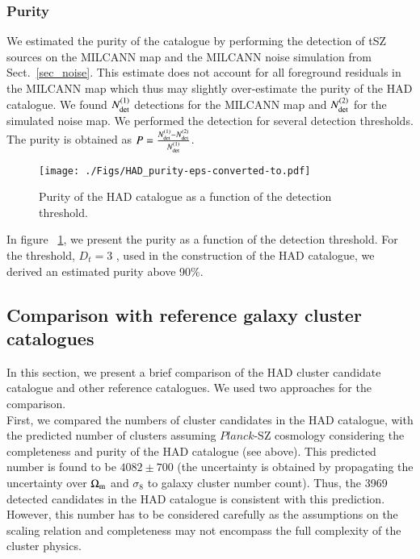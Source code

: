\documentclass[traditabstract,a4,twocolumn]{aa}
\begin{document}
\subsubsection{Purity}

We estimated the purity of the catalogue by performing the
detection of tSZ sources on the MILCANN map and the MILCANN noise
simulation from Sect.~\ref{sec_noise}. This estimate does not
account for all foreground residuals in the MILCANN map which thus
may slightly over-estimate the purity of the HAD catalogue.  We
found $N^{(1)}_{\rm det}$ detections for the MILCANN map and
$N^{(2)}_{\rm det}$ for the simulated noise map. We performed the
detection for several detection thresholds.  The purity is obtained as
$P = \frac{N^{(1)}_{\rm det} - N^{(2)}_{\rm det}}{N^{(1)}_{\rm det}}$.
\begin{figure}[!th]
\begin{center}
\texttt{[image: ./Figs/HAD\_purity-eps-converted-to.pdf]}
\caption{Purity of the HAD catalogue as a function of the detection threshold.}
\label{purefig}
\end{center}
\end{figure}
In figure ~\ref{purefig}, we present the purity as a function of the
detection threshold. For the threshold, $D_t = 3$ , used in the construction of the HAD catalogue, we derived an estimated purity above 90\%.


\subsection{Comparison with reference galaxy cluster catalogues}

In this section, we present a brief comparison of the HAD
cluster candidate catalogue and other reference catalogues.  We
  used two approaches for the comparison.\\ First, we compared the
  numbers of cluster candidates in the HAD catalogue, with the
  predicted number of clusters assuming $Planck$-SZ cosmology
  \citep{planckSZC} considering the completeness and purity of the
  HAD catalogue (see above). This predicted number is found to be $4082 \pm 700$ (the uncertainty is obtained by propagating the uncertainty over $\Omega_{\rm m}$ and $\sigma_8$ to galaxy cluster number count).
  Thus, the 3969 detected candidates in the HAD catalogue is
  consistent with this prediction. 
 However,  this number has to be considered carefully as the assumptions on the scaling relation and completeness may not encompass the full complexity of the cluster physics.
\end{document}
